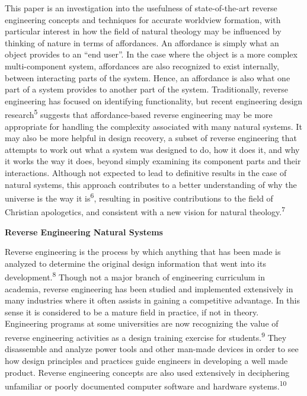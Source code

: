 This paper is an investigation into the usefulness of state-of-the-art
reverse engineering concepts and techniques for accurate worldview
formation, with particular interest in how the field of natural
theology may be influenced by thinking of nature in terms of
affordances. An affordance is simply what an object provides to an “end
user”. In the case where the object is a more complex multi-component
system, affordances are also recognized to exist internally, between
interacting parts of the system. Hence, an affordance is also what one
part of a system provides to another part of the system. Traditionally,
reverse engineering has focused on identifying functionality, but
recent engineering design research\textsuperscript{5} suggests that
affordance-based reverse engineering may be more appropriate for
handling the complexity associated with many natural systems. It may
also be more helpful in design recovery, a subset of reverse
engineering that attempts to work out what a system was designed to do,
how it does it, and why it works the way it does, beyond simply
examining its component parts and their interactions. Although not
expected to lead to definitive results in the case of natural systems,
this approach contributes to a better understanding of why the universe
is the way it is\textsuperscript{6}, resulting in positive
contributions to the field of Christian apologetics, and consistent
with a new vision for natural theology.\textsuperscript{7}


\bigskip


\bigskip


\textbf{Reverse Engineering Natural Systems}


Reverse engineering is the process by which anything that has been made
is analyzed to determine the original design information that went into
its development.\textsuperscript{8} Though not a major branch of
engineering curriculum in academia, reverse engineering has been
studied and implemented extensively in many industries where it often
assists in gaining a competitive advantage. In this sense it is
considered to be a mature field in practice, if not in theory.
Engineering programs at some universities are now recognizing the value
of reverse engineering activities as a design training exercise for
students.\textsuperscript{9} They disassemble and analyze power tools
and other man-made devices in order to see how design principles and
practices guide engineers in developing a well made product. Reverse
engineering concepts are also used extensively in deciphering
unfamiliar or poorly documented computer software and hardware
systems.\textsuperscript{10}


